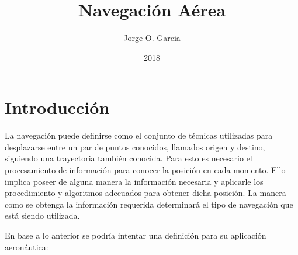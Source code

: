 \documentclass[a4paper,12pt,twoside]{article}
\title{Navegaci\'on A\'erea}
\author{Jorge O. Garcia}
\date{2018}
\begin{document}

\thispagestyle{fancy}
\maketitle

\newpage

\newpage

\thispagestyle{fancy}
\tableofcontents

\newpage
\section{Introducci\'on}

La navegaci\'on puede definirse como el conjunto de t\'ecnicas utilizadas para desplazarse entre un par de puntos conocidos, llamados origen y destino, siguiendo una \gls{trayectoria} tambi\'en conocida. Para esto es necesario el procesamiento de informaci\'on para conocer la posici\'on en cada momento. Ello implica poseer de alguna manera la informaci\'on necesaria y aplicarle los procedimiento y algoritmos adecuados para obtener dicha posici\'on. La manera como se obtenga la informaci\'on requerida determinar\'a el tipo de navegaci\'on que est\'a siendo utilizada.

En base a lo anterior se podr\'ia intentar una definici\'on para su aplicaci\'on aeron\'autica:

\vspace{3mm}

\begin{center}
\end{center}
\end{document}
